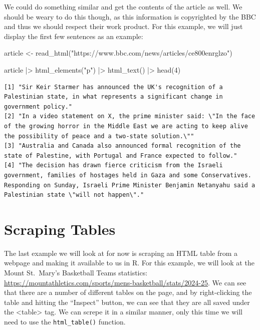 \documentclass[
  letterpaper,
  DIV=11,
  numbers=noendperiod]{scrreprt}
\newenvironment{Shaded}{\begin{snugshade}}{\end{snugshade}}
\newcommand{\DecValTok}[1]{\textcolor[rgb]{0.68,0.00,0.00}{#1}}
\newcommand{\FunctionTok}[1]{\textcolor[rgb]{0.28,0.35,0.67}{#1}}
\newcommand{\NormalTok}[1]{\textcolor[rgb]{0.00,0.23,0.31}{#1}}
\newcommand{\OtherTok}[1]{\textcolor[rgb]{0.00,0.23,0.31}{#1}}
\newcommand{\SpecialCharTok}[1]{\textcolor[rgb]{0.37,0.37,0.37}{#1}}
\newcommand{\StringTok}[1]{\textcolor[rgb]{0.13,0.47,0.30}{#1}}
\begin{document}
We could do something similar and get the contents of the article as
well. We should be weary to do this though, as this information is
copyrighted by the BBC and thus we should respect their work product.
For this example, we will just display the first few sentences as an
example:

\begin{Shaded}
\begin{Highlighting}[]
\NormalTok{article }\OtherTok{\textless{}{-}} \FunctionTok{read\_html}\NormalTok{(}\StringTok{"https://www.bbc.com/news/articles/ce800enrglzo"}\NormalTok{)}

\NormalTok{article }\SpecialCharTok{|\textgreater{}} \FunctionTok{html\_elements}\NormalTok{(}\StringTok{"p"}\NormalTok{) }\SpecialCharTok{|\textgreater{}} \FunctionTok{html\_text}\NormalTok{() }\SpecialCharTok{|\textgreater{}} \FunctionTok{head}\NormalTok{(}\DecValTok{4}\NormalTok{)}
\end{Highlighting}
\end{Shaded}

\begin{verbatim}
[1] "Sir Keir Starmer has announced the UK's recognition of a Palestinian state, in what represents a significant change in government policy."                                                                                                   
[2] "In a video statement on X, the prime minister said: \"In the face of the growing horror in the Middle East we are acting to keep alive the possibility of peace and a two-state solution.\""                                                 
[3] "Australia and Canada also announced formal recognition of the state of Palestine, with Portugal and France expected to follow."                                                                                                              
[4] "The decision has drawn fierce criticism from the Israeli government, families of hostages held in Gaza and some Conservatives. Responding on Sunday, Israeli Prime Minister Benjamin Netanyahu said a Palestinian state \"will not happen\"."
\end{verbatim}

\section{Scraping Tables}\label{scraping-tables}

The last example we will look at for now is scraping an HTML table from
a webpage and making it available to us in R. For this example, we will
look at the Mount St.~Mary's Basketball Teams statistics:
\url{https://mountathletics.com/sports/mens-basketball/stats/2024-25}.
We can see that there are a number of different tables on the page, and
by right-clicking the table and hitting the ``Inspect'' button, we can
see that they are all saved under the \textless table\textgreater{} tag.
We can screpe it in a similar manner, only this time we will need to use
the \texttt{html\_table()} function.
\end{document}

